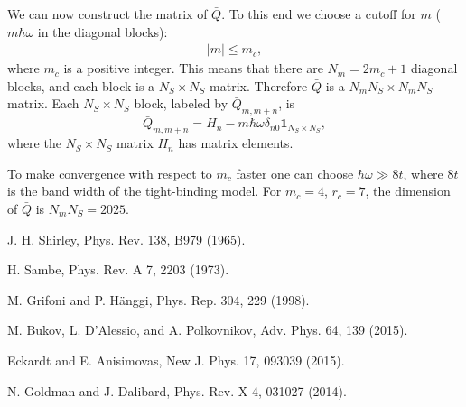 \documentclass[aps,pra,preprint,showpacs]{revtex4-1}
\begin{document}
We can now construct the matrix of $\bar{Q}$. To this end we choose a cutoff for $m$ ($m\hbar \omega$ in the diagonal blocks):
\begin{eqnarray}
	|m|\le m_c,
\end{eqnarray}
where $m_c$ is a positive integer. This means that there are $N_m = 2 m_c + 1$ diagonal blocks, and each block is a $N_S\times N_S$ matrix. Therefore $\bar{Q}$ is a $N_m N_S \times N_m N_S$ matrix. Each $N_S \times N_S$ block, labeled by $\bar{Q}_{m,m+n}$, is
\begin{equation}
	\bar{Q}_{m,m+n} = H_n - m\hbar \omega \delta_{n0} \bm{1}_{N_S\times N_S},
\end{equation} 
where the $N_S \times N_S$ matrix $H_n$ has matrix elements.

To make convergence with respect to $m_c$ faster one can choose $\hbar \omega \gg 8t$, where $8t$ is the band width of the tight-binding model. For $m_c = 4$, $r_c = 7$, the dimension of $\bar{Q}$ is $N_m N_S = 2025$.

\begin{thebibliography}{99}
 J. H. Shirley, Phys. Rev. 138, B979 (1965).

 H. Sambe, Phys. Rev. A 7, 2203 (1973).

 M. Grifoni and P. H\"{a}nggi, Phys. Rep. 304, 229 (1998).

 M. Bukov, L. D'Alessio, and A. Polkovnikov, Adv. Phys. 64, 139
(2015).

 Eckardt and E. Anisimovas, New J. Phys. 17, 093039 (2015).

 N. Goldman and J. Dalibard, Phys. Rev. X 4, 031027 (2014).

\end{thebibliography}
\end{document}
